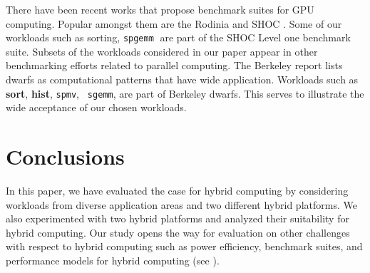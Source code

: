 \documentclass[11pt]{article}
\newcommand{\sgemm} {{\tt spgemm}}
\newcommand{\hist} {{\bf hist}}
\newcommand{\sort} {{\bf sort}}
\begin{document}
There have been recent works that propose benchmark suites for GPU
computing. Popular amongst them are the Rodinia \cite{rodinia} and SHOC
\cite{shoc}. Some of our workloads such as sorting, \sgemm$\;$
are part of the SHOC Level one benchmark suite.
Subsets of the workloads considered in our paper appear in other
benchmarking efforts related to parallel computing. The Berkeley report
\cite{landscape} lists dwarfs as computational patterns that have wide
application. Workloads such as \sort, \hist, {\tt spmv}, {\tt
sgemm},  are part of Berkeley dwarfs. This
serves to illustrate the wide acceptance of our chosen workloads.


\section{Conclusions}
\label{sec:concl}
In this paper, we have evaluated the case for hybrid computing
by considering workloads from diverse application areas and two different
hybrid platforms. We also
experimented with two hybrid platforms and analyzed their suitability 
for hybrid computing. 
Our study opens the way
for evaluation on other challenges with respect to hybrid computing such as 
power efficiency, benchmark suites, and performance models
for hybrid computing (see \cite{hipc09,kim09}).


 

 
\end{document}
